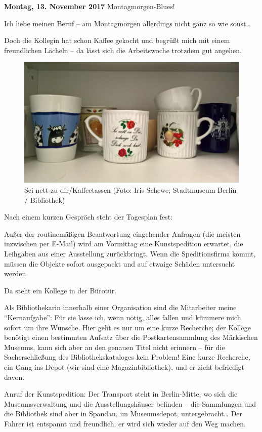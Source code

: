 \documentclass[a4paper,
fontsize=11pt,
oneside,
numbers=noperiodatend,
parskip=half-,
bibliography=totoc,
final
]{scrartcl}
\begin{document}
\textbf{Montag, 13. November 2017} Montagmorgen-Blues!

Ich liebe meinen Beruf -- am Montagmorgen allerdings nicht ganz so wie
sonst\ldots{}

Doch die Kollegin hat schon Kaffee gekocht und begrüßt mich mit einem
freundlichen Lächeln -- da lässt sich die Arbeitswoche trotzdem gut
angehen.

\begin{figure}
\centering
\includegraphics{img/Schewe_1.jpg}
\caption{Sei nett zu dir/Kaffeetassen (Foto: Iris Schewe; Stadtmuseum
Berlin / Bibliothek)}
\end{figure}

Nach einem kurzen Gespräch steht der Tagesplan fest:

Außer der routinemäßigen Beantwortung eingehender Anfragen (die meisten
inzwischen per E-Mail) wird am Vormittag eine Kunstspedition erwartet,
die Leihgaben aus einer Ausstellung zurückbringt. Wenn die
Speditionsfirma kommt, müssen die Objekte sofort ausgepackt und auf
etwaige Schäden untersucht werden.

Da steht ein Kollege in der Bürotür.

Als Bibliothekarin innerhalb einer Organisation sind die Mitarbeiter
meine \enquote{Kernaufgabe}: Für sie lasse ich, wenn nötig, alles fallen
und kümmere mich sofort um ihre Wünsche. Hier geht es nur um eine kurze
Recherche; der Kollege benötigt einen bestimmten Aufsatz über die
Postkartensammlung des Märkischen Museums, kann sich aber an den genauen
Titel nicht erinnern -- für die Sacherschließung des
Bibliothekskataloges kein Problem! Eine kurze Recherche, ein Gang ins
Depot (wir sind eine Magazinbibliothek), und er zieht befriedigt davon.

Anruf der Kunstspedition: Der Transport steht in Berlin-Mitte, wo sich
die Museumsverwaltung und die Ausstellungshäuser befinden -- die
Sammlungen und die Bibliothek sind aber in Spandau, im Museumsdepot,
untergebracht\ldots{} Der Fahrer ist entspannt und freundlich; er wird
sich wieder auf den Weg machen.
\end{document}
